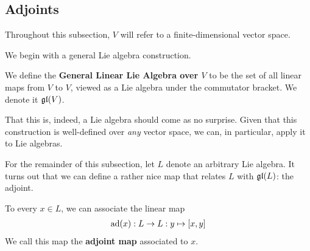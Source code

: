 \subsection{Adjoints}

Throughout this subsection, $V$ will refer to a finite-dimensional vector space.

We begin with a general Lie algebra construction.

\begin{boxdefinition}\label{Ch1:Def:gl_V}
    We define the \textbf{General Linear Lie Algebra over $V$} to be the set of all linear maps from $V$ to $V$, viewed as a Lie algebra under the commutator bracket. We denote it $\mathfrak{gl}\!\left( V \right)$.
\end{boxdefinition}

That this is, indeed, a Lie algebra should come as no surprise. Given that this construction is well-defined over \textit{any} vector space, we can, in particular, apply it to Lie algebras.

For the remainder of this subsection, let $L$ denote an arbitrary Lie algebra. It turns out that we can define a rather nice map that relates $L$ with $\mathfrak{gl}\!\left( L \right)$: the adjoint.

\begin{boxdefinition}
    To every $x \in L$, we can associate the linear map
    \begin{align*}
        \operatorname{ad}\!\left( x \right) : L \to L : y \mapsto \left[ x, y \right]
    \end{align*}
    We call this map the \textbf{adjoint map} associated to $x$.
\end{boxdefinition}

